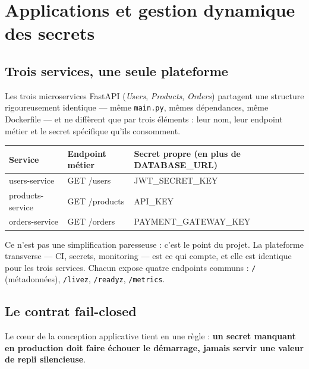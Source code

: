 \documentclass[12pt,a4paper,twoside,openright]{report}
\begin{document}
\clearpage
\chapter{Applications et gestion dynamique des secrets}

\section{Trois services, une seule plateforme}

Les trois microservices FastAPI (\emph{Users}, \emph{Products}, \emph{Orders})
partagent une structure rigoureusement identique — même \texttt{main.py}, mêmes
dépendances, même Dockerfile — et ne diffèrent que par trois éléments : leur nom,
leur endpoint métier et le secret spécifique qu'ils consomment.

\begin{table}[H]
\centering\small
\begin{tabular}{@{}llp{7.4cm}@{}}
\toprule
\textbf{Service} & \textbf{Endpoint métier} & \textbf{Secret propre (en plus de DATABASE\_URL)} \\
\midrule
users-service & GET /users & JWT\_SECRET\_KEY \\
products-service & GET /products & API\_KEY \\
orders-service & GET /orders & PAYMENT\_GATEWAY\_KEY \\
\bottomrule
\end{tabular}
\end{table}

Ce n'est pas une simplification paresseuse : c'est le point du projet. La
plateforme transverse — CI, secrets, monitoring — est ce qui compte, et elle est
identique pour les trois services. Chacun expose quatre endpoints communs :
\texttt{/} (métadonnées), \texttt{/livez}, \texttt{/readyz}, \texttt{/metrics}.

\section{Le contrat fail-closed}

Le cœur de la conception applicative tient en une règle : \textbf{un secret manquant
en production doit faire échouer le démarrage, jamais servir une valeur de
repli silencieuse}.
\end{document}
